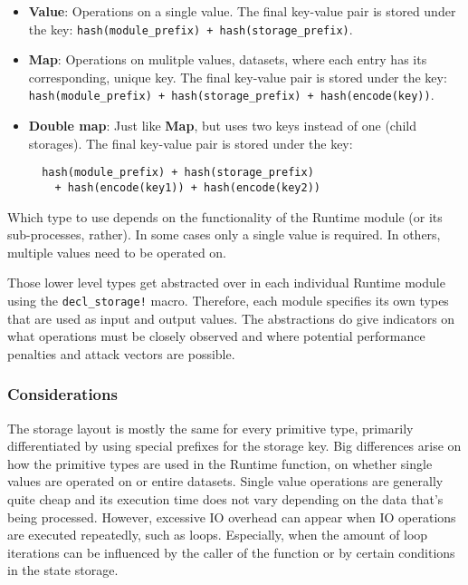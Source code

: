 \documentclass[11pt,a4paper]{article}
\begin{document}
\begin{itemize}
  \item \textbf{Value}: Operations on a single value.
  \newline\newline
  The final key-value pair is stored under the key:\newline
  \verb|hash(module_prefix) + hash(storage_prefix)|.
  \item \textbf{Map}: Operations on mulitple values, datasets, where each entry has its
  corresponding, unique key.
  \newline\newline
  The final key-value pair is stored under the key:\newline
  \verb|hash(module_prefix) + hash(storage_prefix) + hash(encode(key))|.
  \newpage
  \item \textbf{Double map}: Just like \textbf{Map}, but uses two keys instead of one 
  (child storages).
  \newline\newline
  The final key-value pair is stored under the key:\newline
  \begin{verbatim}
  hash(module_prefix) + hash(storage_prefix)
    + hash(encode(key1)) + hash(encode(key2))
  \end{verbatim}
\end{itemize}

Which type to use depends on the functionality of the Runtime module (or its sub-processes, rather).
In some cases only a single value is required. In others, multiple values need to be operated on.
\newline

Those lower level types get abstracted over in each individual Runtime module using the \verb|decl_storage!|
macro. Therefore, each module specifies its own types that are used as input and output values.
The abstractions do give indicators on what operations must be closely observed and where potential
performance penalties and attack vectors are possible.

\subsubsection{Considerations}\label{sect:primitive-types-considerations}

The storage layout is mostly the same for every primitive type, primarily differentiated
by using special prefixes for the storage key. Big differences arise on how the primitive
types are used in the Runtime function, on whether single values are operated on or entire
datasets. Single value operations are generally quite cheap and its execution time does
not vary depending on the data that's being processed. However, excessive IO overhead can appear
when IO operations are executed repeatedly, such as loops. Especially, when the amount of loop
iterations can be influenced by the caller of the function or by certain conditions in the
state storage.
\newline
\end{document}
